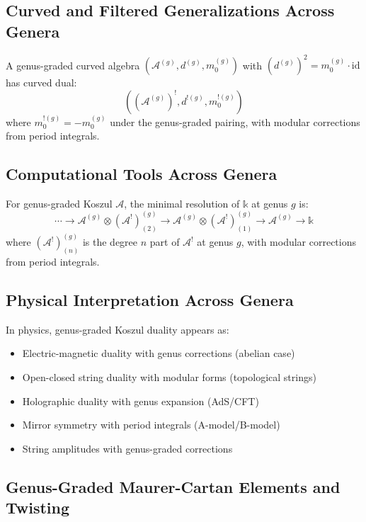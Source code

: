 \subsection{Curved and Filtered Generalizations Across Genera}

\begin{definition}
A genus-graded curved algebra $(\mathcal{A}^{(g)}, d^{(g)}, m_0^{(g)})$ with $(d^{(g)})^2 = m_0^{(g)} \cdot \text{id}$ has curved dual:
$$((\mathcal{A}^{(g)})^!, d^{!(g)}, m_0^{!(g)})$$
where $m_0^{!(g)} = -m_0^{(g)}$ under the genus-graded pairing, with modular corrections from period integrals.
\end{definition}

\subsection{Computational Tools Across Genera}

\begin{lemma}
For genus-graded Koszul $\mathcal{A}$, the minimal resolution of $\mathbb{k}$ at genus $g$ is:
$$\cdots \to \mathcal{A}^{(g)} \otimes (\mathcal{A}^!)_{(2)}^{(g)} \to \mathcal{A}^{(g)} \otimes (\mathcal{A}^!)_{(1)}^{(g)} \to \mathcal{A}^{(g)} \to \mathbb{k}$$
where $(\mathcal{A}^!)_{(n)}^{(g)}$ is the degree $n$ part of $\mathcal{A}^!$ at genus $g$, with modular corrections from period integrals.
\end{lemma}

\subsection{Physical Interpretation Across Genera}

In physics, genus-graded Koszul duality appears as:
\begin{itemize}
\item Electric-magnetic duality with genus corrections (abelian case)
\item Open-closed string duality with modular forms (topological strings)  
\item Holographic duality with genus expansion (AdS/CFT)
\item Mirror symmetry with period integrals (A-model/B-model)
\item String amplitudes with genus-graded corrections
\end{itemize}

\subsection{Genus-Graded Maurer-Cartan Elements and Twisting}

